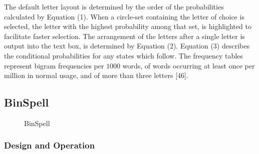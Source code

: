 \documentclass[12pt,titlepage]{article}
\begin{document}
The default letter layout is determined by the order of the probabilities calculated by Equation (1). 
When a circle-set containing the letter of choice is selected, the letter with the highest probability 
among that set, is highlighted to facilitate faster selection.  The arrangement of the letters after a single 
letter is output into the text box, is determined by Equation (2).  Equation (3) describes the conditional 
probabilities for any states which follow.  The frequency tables represent bigram frequencies per $1000$ 
words, of words occurring at least once per million in normal usage, and of more than three letters [46].

\subsection{BinSpell}

\begin{figure}
\centering
{}
\caption{BinSpell}
\label{fig:Bin}
\end{figure}

\subsubsection{Design and Operation}
\end{document}
